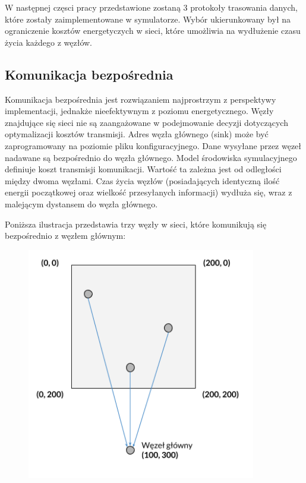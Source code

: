\documentclass[a4paper,12pt,twoside,openany]{report}
\begin{document}
W następnej częsci pracy przedstawione zostaną 3 protokoły trasowania danych, które zostały zaimplementowane w symulatorze.
Wybór ukierunkowany był na ograniczenie kosztów energetyczych w sieci, które umożliwia na wydłużenie czasu życia każdego z węzłów.

\subsection{Komunikacja bezpośrednia}

Komunikacja bezpośrednia jest rozwiązaniem najprostrzym z perspektywy implementacji, jednakże nieefektywnym z poziomu energetycznego. 
Węzły znajdujące się sieci nie są zaangażowane w podejmowanie decyzji dotyczących optymalizacji kosztów transmisji. 
Adres węzła głównego (sink) może być zaprogramowany na poziomie pliku konfiguracyjnego.
Dane wysyłane przez węzeł nadawane są bezpośrednio do węzła głównego.
Model środowiska symulacyjnego definiuje koszt transmisji komunikacji. Wartość ta zależna jest od odległości między dwoma węzłami.
Czas życia węzłów (posiadających identyczną ilość energii początkowej oraz wielkość przesyłanych informacji) wydłuża się, wraz z malejącym dystansem do węzła głównego.

Poniższa ilustracja przedstawia trzy węzły w sieci, które komunikują się bezpośrednio z węzłem głównym:

\begin{figure}[H]
 \centering
 \includegraphics[width=10cm]{images/komunikacja_bezposrednia.png}
\end{figure}
\end{document}
